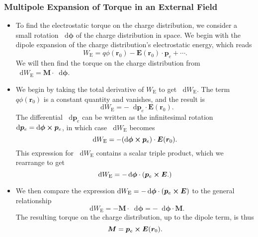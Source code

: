 \documentclass[11pt, a4paper]{article}
\newcommand{\diff}{\mathop{}\!\mathrm{d}} %
\renewcommand{\vec}[1]{\bm{#1}} %
\renewcommand{\r}{\vec{r}}
\newcommand{\E}{\vec{E}} %
\newcommand{\M}{\vec{M}}  %
\newcommand{\pe}{\vec{p}_{e}}  %
\begin{document}
\subsubsection{Multipole Expansion of Torque in an External Field}

\begin{itemize}

	\item To find the electrostatic torque on the charge distribution, we consider a small rotation $ \diff \vec{\phi} $ of the charge distribution in space. We begin with the dipole expansion of the charge distribution's electrostatic energy, which reads
	\begin{equation*}
		W_{\text{E}} = q \phi(\r_{0}) - \E (\r_{0}) \cdot \pe + \cdots.
	\end{equation*}
    We will then find the torque on the charge distribution from $ \diff W_{\text{E}} = \M \cdot \diff \vec{\phi} $.

    \item We begin by taking the total derivative of $ W_{\text{E}} $ to get $ \diff W_{\text{E}} $. The term $ q \phi(\r_{0}) $ is a constant quantity and vanishes, and the result is
	\begin{equation*}
		\diff W_{\text{E}} = - \diff \pe \cdot \E(\r_{0}).
	\end{equation*}
    The differential $ \diff \pe $ can be written as the infinitesimal rotation $ \diff \pe = \diff \vec{\phi} \cross \pe $, in which case $ \diff W_{\text{E}} $ becomes
	\begin{equation*}
		\diff W_{\text{E}} = - (\diff \vec{\phi} \cross \pe)\cdot \E(\r_{0}).
	\end{equation*}
    This expression for $ \diff W_{\text{E}} $ contains a scalar triple product, which we rearrange to get
    \begin{equation*}
        \diff W_{\text{E}} = - \diff \vec{\phi} \cdot (\pe \cross \E.)
    \end{equation*}

    \item We then compare the expression $ \diff W_{\text{E}} = - \diff \vec{\phi} \cdot (\pe \cross \E) $ to the general relationship
	\begin{equation*}
        \diff W_{\text{E}} = - \vec{M} \cdot \diff \vec{\phi} = - \diff \vec{\phi} \cdot \M.
	\end{equation*}
    The resulting torque on the charge distribution, up to the dipole term, is thus 
    \begin{equation*}
       \vec{M} = \pe \cross \E(\r_{0}).
    \end{equation*}
	
\end{itemize}
    
\end{document}
